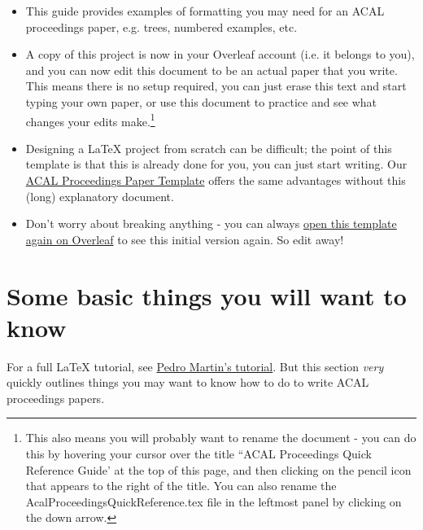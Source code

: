\documentclass[output=paper,colorlinks,citecolor=brown,
]{langscibook}
\begin{document}
\begin{itemize}

\item This guide provides examples of formatting you may need for an ACAL proceedings paper, e.g. trees, numbered examples, etc. 

\item A copy of this project is now in your Overleaf account (i.e. it belongs to you), and you can now edit this document to be an actual paper that you write. This means there is no setup required, you can just erase this text and start typing your own paper, or use this document to practice and see what changes your edits make.\footnote{This also means you will probably want to rename the document - you can do this by hovering your cursor over the title ``ACAL Proceedings Quick Reference Guide' at the top of this page, and then clicking on the pencil icon that appears to the right of the title. You can also rename the AcalProceedingsQuickReference.tex file in the leftmost panel by clicking on the down arrow.} 

\item Designing a \LaTeX{} project from scratch can be difficult; the point of this template is that this is already done for you, you can just start writing. Our \href{https://www.overleaf.com/latex/templates/acal-proceedings-template/kxmngmsjvfqq}{ACAL Proceedings Paper Template} offers the same advantages without this (long) explanatory document.

\item Don't worry about breaking anything - you can always  \href{https://www.overleaf.com/latex/templates/acal-proceedings-latex-quick-reference-guide/fncrcrtgnxhv}{open this template again on Overleaf} to see this initial version again. So edit away!


\end{itemize}

\section{Some basic things you will want to know}

For a full \LaTeX{} tutorial, see \href{http://ptmartins.info/latex/}{Pedro Martin's tutorial}. But this section \textit{very} quickly outlines things you may want to know how to do to write ACAL proceedings papers. 
\end{document}
